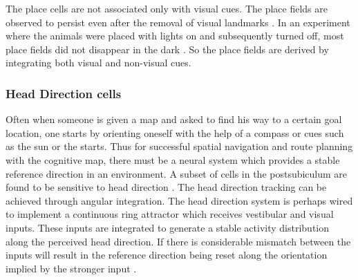 The place cells are not associated only with visual cues. The place fields are observed to persist even after the removal of visual landmarks \cite{Kubie1987}. In an experiment where the animals were placed with lights on and subsequently turned off, most place fields did not disappear in the dark \cite{Muller2008}. So the place fields are derived by integrating both visual and non-visual cues. \\ 





 
\subsubsection{Head Direction cells}
Often when someone is given a map and asked to find his way to a certain goal location, one starts by orienting oneself with the help of a compass or cues such as the sun or the starts. Thus for successful spatial navigation and route planning with the cognitive map, there must be a neural system which provides a stable reference direction in an environment. A subset of cells in the postsubiculum  are found to be sensitive to head direction \cite{Taube1990}. The head direction tracking can be achieved through angular integration. The head direction system is perhaps wired to implement a continuous ring attractor which receives vestibular and visual inputs. These inputs are integrated to generate a stable activity distribution along the perceived head direction. If there is considerable mismatch between the inputs will result in the reference direction being reset along the orientation implied by the stronger input \cite{Valerio2012}.

